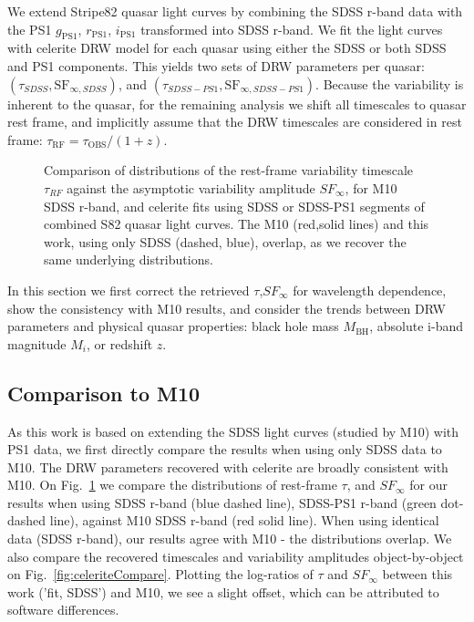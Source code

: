 \documentclass[twocolumn]{aastex62}
\newcommand{\project}[1]{\textsf{#1}}
\begin{document}
We extend Stripe82 quasar light curves by combining the SDSS r-band data with  the PS1 $g_{\mathrm{PS1}}$, $r_{\mathrm{PS1}}$, $i_{\mathrm{PS1}}$ transformed into SDSS r-band. We fit the light curves with \project{celerite} DRW model for each quasar using either the SDSS or both SDSS and PS1 components. This yields two sets of DRW parameters per quasar: $(\tau_{SDSS}, \mathrm{SF}_{\infty, SDSS})$, and $(\tau_{SDSS-PS1}, \mathrm{SF}_{\infty, SDSS-PS1})$. Because the variability is inherent to the quasar, for the remaining analysis we shift all timescales to quasar rest frame, and implicitly assume that the DRW timescales are considered in rest frame: $\tau_{\mathrm{RF}} = \tau_{\mathrm{OBS}} / (1+z)$.


\begin{figure} %
\caption{Comparison of distributions of the rest-frame variability timescale $\tau_{RF}$ against the  asymptotic variability amplitude $SF_{\infty}$, for M10 SDSS r-band,  and \project{celerite} fits using  SDSS or SDSS-PS1 segments of combined S82 quasar light curves. The M10 (red,solid lines) and this work, using only SDSS (dashed, blue), overlap, as we recover the same underlying distributions. }
\label{fig:tauRF_SFinf}
\end{figure} 


In this section we first correct  the retrieved $\tau$,$SF_{\infty}$ for wavelength dependence, show the consistency with M10 results,  and consider the trends between DRW parameters and physical quasar properties: black hole mass $M_{\mathrm{BH}}$, absolute i-band  magnitude $M_{i}$, or redshift $z$.  


\subsection{Comparison to M10}
As this work is based on extending the SDSS light curves (studied by M10) with PS1 data, we first directly compare the results when using only SDSS data to M10. The DRW parameters recovered with \project{celerite} are  broadly consistent with M10. On Fig.~\ref{fig:tauRF_SFinf} we compare the distributions of rest-frame $\tau$, and $SF_{\infty}$ for our results when using SDSS  r-band (blue dashed line),  SDSS-PS1 r-band (green dot-dashed line), against  M10 SDSS r-band (red solid line). When using identical data (SDSS r-band), our results agree with M10 - the distributions overlap. We also compare the recovered timescales and variability amplitudes object-by-object on Fig.~\ref{fig:celeriteCompare}.  Plotting the log-ratios of $\tau$ and $SF_{\infty}$ between this work ('fit, SDSS') and M10, we see a slight offset, which can be attributed to software differences. 
\end{document}
